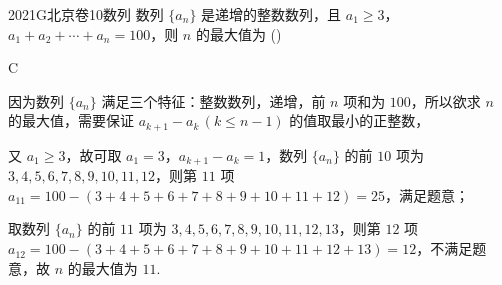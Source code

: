 
\begin{problem}{2021}{G}{北京卷}{10}{数列}
数列 $\{a_n\}$ 是递增的整数数列，且 $a_1\geq 3$，$a_1+a_2+\cdots+a_n=100$，则 $n$ 的最大值为 (\hspace{1cm})
\begin{choices}
\end{choices}
\end{problem}

\begin{answer}
C
\end{answer}

\begin{solutions}
因为数列 $\{a_n\}$ 满足三个特征：整数数列，递增，前 $n$ 项和为 $100$，所以欲求 $n$ 的最大值，需要保证 $a_{k+1}-a_k\,(k\leq n-1)$ 的值取最小的正整数，

又 $a_1\geq 3$，故可取 $a_1=3$，$a_{k+1}-a_k=1$，数列 $\{a_n\}$ 的前 $10$ 项为 $3,4,5,6,7,8,9,10,11,12$，则第 $11$ 项 $a_{11}=100-(3+4+5+6+7+8+9+10+11+12)=25$，满足题意；

取数列 $\{a_n\}$ 的前 $11$ 项为 $3,4,5,6,7,8,9,10,11,12,13$，则第 $12$ 项 $a_{12}=100-(3+4+5+6+7+8+9+10+11+12+13)=12$，不满足题意，故 $n$ 的最大值为 $11$.
\end{solutions}